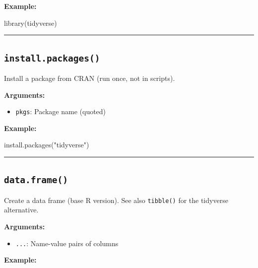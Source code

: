 \documentclass[
  letterpaper,
  DIV=11,
  numbers=noendperiod]{scrreprt}
\newenvironment{Shaded}{\begin{snugshade}}{\end{snugshade}}
\newcommand{\FunctionTok}[1]{\textcolor[rgb]{0.28,0.35,0.67}{#1}}
\newcommand{\NormalTok}[1]{\textcolor[rgb]{0.00,0.23,0.31}{#1}}
\newcommand{\StringTok}[1]{\textcolor[rgb]{0.13,0.47,0.30}{#1}}
\providecommand{\tightlist}{%
  \setlength{\itemsep}{0pt}\setlength{\parskip}{0pt}}
\begin{document}
\textbf{Example:}

\begin{Shaded}
\begin{Highlighting}[]
\FunctionTok{library}\NormalTok{(tidyverse)}
\end{Highlighting}
\end{Shaded}

\begin{center}\rule{0.5\linewidth}{0.5pt}\end{center}

\subsection{\texorpdfstring{\texttt{install.packages()}}{install.packages()}}\label{install.packages}

Install a package from CRAN (run once, not in scripts).

\textbf{Arguments:}

\begin{itemize}
\tightlist
\item
  \texttt{pkgs}: Package name (quoted)
\end{itemize}

\textbf{Example:}

\begin{Shaded}
\begin{Highlighting}[]
\FunctionTok{install.packages}\NormalTok{(}\StringTok{"tidyverse"}\NormalTok{)}
\end{Highlighting}
\end{Shaded}

\begin{center}\rule{0.5\linewidth}{0.5pt}\end{center}

\subsection{\texorpdfstring{\texttt{data.frame()}}{data.frame()}}\label{data.frame}

Create a data frame (base R version). See also \texttt{tibble()} for the
tidyverse alternative.

\textbf{Arguments:}

\begin{itemize}
\tightlist
\item
  \texttt{...}: Name-value pairs of columns
\end{itemize}

\textbf{Example:}
\end{document}
